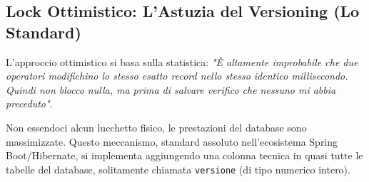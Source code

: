 \subsection{Lock Ottimistico: L'Astuzia del Versioning (Lo Standard)}

L'approccio ottimistico si basa sulla statistica: \textit{"È altamente improbabile che due operatori modifichino lo stesso esatto record nello stesso identico millisecondo. Quindi non blocco nulla, ma prima di salvare verifico che nessuno mi abbia preceduto"}.

Non essendoci alcun lucchetto fisico, le prestazioni del database sono massimizzate. Questo meccanismo, standard assoluto nell'ecosistema Spring Boot/Hibernate, si implementa aggiungendo una colonna tecnica in quasi tutte le tabelle del database, solitamente chiamata \texttt{versione} (di tipo numerico intero).

